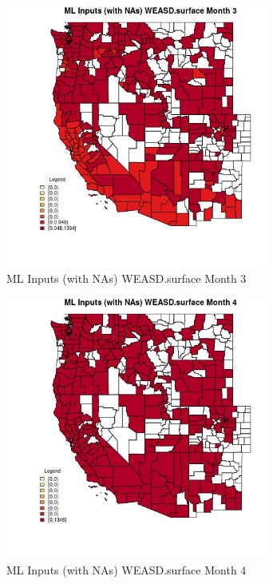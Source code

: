 \begin{figure} 
\centering  
\includegraphics[width=0.77\textwidth]{Code_Outputs/Report_ML_input_PM25_Step4_part_e_de_duplicated_aves_compiled_2019-05-21wNAs_CountyWEASDsurfacemedianMonth3.jpg} 
\caption{\label{fig:Report_ML_input_PM25_Step4_part_e_de_duplicated_aves_compiled_2019-05-21wNAsCountyWEASDsurfacemedianMonth3}ML Inputs (with NAs) WEASD.surface Month 3} 
\end{figure} 
 

\begin{figure} 
\centering  
\includegraphics[width=0.77\textwidth]{Code_Outputs/Report_ML_input_PM25_Step4_part_e_de_duplicated_aves_compiled_2019-05-21wNAs_CountyWEASDsurfacemedianMonth4.jpg} 
\caption{\label{fig:Report_ML_input_PM25_Step4_part_e_de_duplicated_aves_compiled_2019-05-21wNAsCountyWEASDsurfacemedianMonth4}ML Inputs (with NAs) WEASD.surface Month 4} 
\end{figure} 
 

